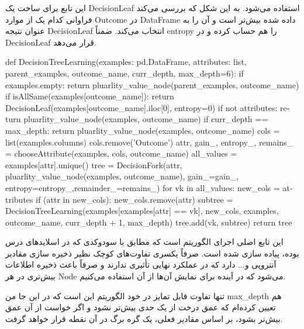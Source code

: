 \documentclass[12pt,titlepage,a4page , tikz , multi,table , svgnames,xcdraw]{article}
\begin{document}
این تابع برای ساخت یک DecisionLeaf استفاده می‌شود. به این شکل که بررسی می‌کند فراوانی کدام یک از موارد Outcome در DataFrame داده شده بیش‌تر است و آن را به عنوان نتیجه DecisionLeaf انتخاب می‌کند. ضمناً entropy را هم حساب کرده و در DecisionLeaf قرار می‌دهد.

\newpage


   \begin{latin}
\begin{python}[language=Python]

def DecisionTreeLearning(examples: pd.DataFrame, attributes: list,
 parent_examples, outcome_name, curr_depth, max_depth=6):
    if examples.empty:
        return pluarlity_value_node(parent_examples, outcome_name)
    if isAllSame(examples[outcome_name]):
        return DecisionLeaf(examples[outcome_name].iloc[0], entropy=0)
    if not attributes:
        return pluarlity_value_node(examples, outcome_name)
    if curr_depth == max_depth:
        return pluarlity_value_node(examples, outcome_name)
    cols = list(examples.columns)
    cols.remove('Outcome')
    attr, gain_, entropy_, remains_ = chooseAttribute(examples, cols,
     outcome_name)
    all_values = examples[attr].unique()
    tree = DecisionFork(attr,
     pluarlity_value_node(examples, outcome_name),
     gain_=gain_, entropy=entropy_,remainder_=remains_)
    for vk in all_values:
        new_cols = attributes
        if (attr in new_cols):
            new_cols.remove(attr)
        subtree = DecisionTreeLearning(examples[examples[attr] == vk],
         new_cols, examples, outcome_name, curr_depth + 1, max_depth)
        tree.add(vk, subtree)
    return tree
\end{python}

\end{latin}

این تابع اصلی اجرای الگوریتم است که مطابق با سودوکدی که در اسلایدهای درس بوده، پیاده سازی شده است. صرفاً یکسری تفاوت‌های کوچک نظیر ذخیره سازی مقادیر آنتروپی و... دارد که در عملکرد نهایی تأثیری ندارند و صرفاً باعث ذخیره اطلاعات بیش‌تری در هر Node می‌شود که در آینده برای نمایش آن‌ها از آن استفاده می‌کنیم.

تنها تفاوت قابل تمایز در خود الگوریتم این است که در این جا من max\_depth هم تعیین کرده‌ام که عمق درخت از یک حدی بیش‌تر نشود و اگر خواست از آن عمق بیش‌تر بشود، بر اساس مقادیر فعلی، یک گره برگ در آن نقطه قرار خواهد گرفت.

\newpage
\end{document}
